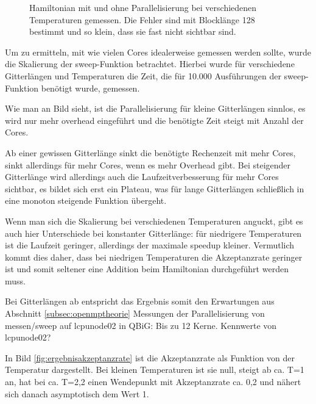 \documentclass{scrreprt}
\begin{document}
	\begin{figure}[htbp]
		
		\label{fig:vergleichham}
		\caption[Hamiltonian mit und ohne Parallelisierung]{Hamiltonian mit und ohne Parallelisierung bei verschiedenen Temperaturen gemessen. Die Fehler sind mit Blocklänge 128 bestimmt und so klein, dass sie fast nicht sichtbar sind.}
	\end{figure}
	
	Um zu ermitteln, mit wie vielen Cores idealerweise gemessen werden sollte, wurde die Skalierung der sweep-Funktion betrachtet. Hierbei wurde für verschiedene Gitterlängen und Temperaturen die Zeit, die für 10.000 Ausführungen der sweep-Funktion benötigt wurde, gemessen. 
	
	Wie man an Bild sieht, ist die Parallelisierung für kleine Gitterlängen sinnlos, es wird nur mehr overhead eingeführt und die benötigte Zeit steigt mit Anzahl der Cores.
	
	Ab einer gewissen Gitterlänge sinkt die benötigte Rechenzeit mit mehr Cores, sinkt allerdings für mehr Cores, wenn es mehr Overhead gibt. Bei steigender Gitterlänge wird allerdings auch die Laufzeitverbesserung für mehr Cores sichtbar, es bildet sich erst ein Plateau, was für lange Gitterlängen schließlich in eine monoton steigende Funktion übergeht.
	
	Wenn man sich die Skalierung bei verschiedenen Temperaturen anguckt, gibt es auch hier Unterschiede bei konstanter Gitterlänge: für niedrigere Temperaturen ist die Laufzeit geringer, allerdings der maximale speedup kleiner. Vermutlich kommt dies daher, dass bei niedrigen Temperaturen die Akzeptanzrate geringer ist und somit seltener eine Addition beim Hamiltonian durchgeführt werden muss.
	
	Bei Gitterlängen ab  entspricht das Ergebnis somit den Erwartungen aus Abschnitt \ref{subsec:openmptheorie}
	Messungen der Parallelisierung von messen/sweep auf lcpunode02 in QBiG: Bis zu 12 Kerne. Kennwerte von lcpunode02?
	
	
	
	In Bild \ref{fig:ergebnisakzeptanzrate} ist die Akzeptanzrate als Funktion von der Temperatur dargestellt. Bei kleinen Temperaturen ist sie null, steigt ab ca. T=1 an, hat bei ca. T=2,2 einen Wendepunkt mit Akzeptanzrate ca. 0,2 und nähert sich danach asymptotisch dem Wert 1.
	
\end{document}
